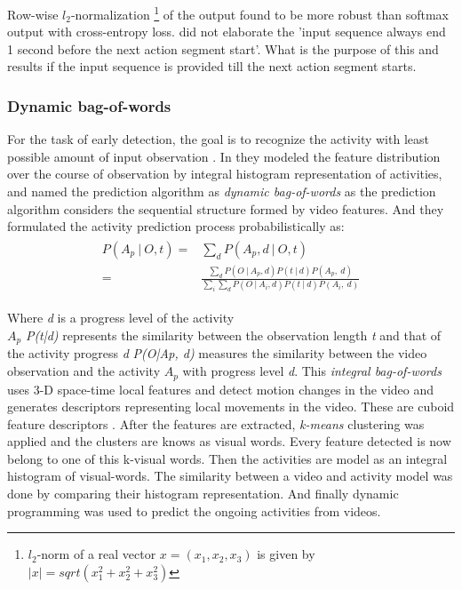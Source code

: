 \newpara Row-wise $\textit{l}_2$-normalization \footnote{$l_2$-norm of a real vector $x=(x_1,x_2,x_3)$ is given by $|x|=sqrt(x_1^2+x_2^2+x_3^2)$} of the output found to be more robust than softmax output with cross-entropy loss. \cite{abu2018will} did not elaborate the 'input sequence always end 1 second before the next action segment start'. What is the purpose of this and results if the input sequence is provided till the next action segment starts.

\subsubsection{Dynamic bag-of-words} 
For the task of early detection, the goal is to recognize the activity with least possible amount of input observation \cite{ryoo2011human}. In \cite{ryoo2011human} they modeled the feature distribution over the course of observation by integral histogram representation of activities, and named the prediction algorithm as \textit{dynamic bag-of-words} as the prediction algorithm considers the sequential structure formed by video features. And they formulated the activity prediction process probabilistically as:
\begin{align}
\begin{split}
		P(A_{p}\: |\: O,t) ={}& \displaystyle \sum_{d}  P(A_{p},d\: |\: O,t)\\
		={}&	\frac{\sum_{d} P(O\: | \: A_{p},d)P(t\: | \:d)P(A_{p},\: d)}
	 {\sum_{i}\sum_{d} P(O\: | \: A_{i},d)P(t\: | \:d)P(A_{i},\: d) }
\end{split}
\end{align}

\newpara Where \textit{d} is a progress level of the activity \\
\textit{$A_{p}$}  \textit{ P(t|d)} represents the similarity between the observation length \textit{t} and that of the activity progress \textit{d}
\textit{P(O|Ap, d)} measures the similarity between the video observation and the activity \textit{$A_{p}$} with progress level \textit{d}. This \textit{integral bag-of-words} uses 3-D space-time local features and detect motion changes in the video and generates descriptors representing local movements in the video. These are cuboid feature descriptors \cite{dollar2005behavior}. After the features are extracted, \textit{k-means} clustering was applied and the clusters are knows as visual words. Every feature detected is now belong to one of this k-visual words. Then the activities are model as an integral histogram of visual-words. The similarity between a video and activity model was done by comparing their histogram representation. And finally dynamic programming was used to predict the ongoing activities from videos.


